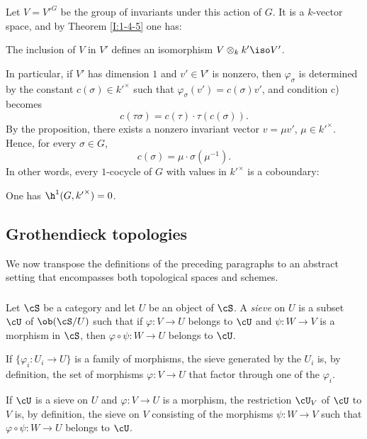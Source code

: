\documentclass[oneside]{book}
\begin{document}
Let $V={V'}^G$ be the group of invariants under this action of $G$. It
is a $k$-vector space, and by Theorem \ref{I:1-4-5} one has:

\begin{proposition}\label{I:1-5-2}
The inclusion of $V$ in $V'$ defines an isomorphism
$V\otimes_k k'\iso V'$.
\end{proposition}

In particular, if $V'$ has dimension $1$ and $v'\in V'$ is nonzero, then
$\varphi_\sigma$ is determined by the constant
$c(\sigma)\in {k'}^\times$ such that
$\varphi_\sigma(v')=c(\sigma)v'$, and condition c) becomes
\[
  c(\tau\sigma) = c(\tau)\cdot \tau(c(\sigma))\text{.}
\]
By the proposition, there exists a nonzero invariant vector
$v=\mu v'$, $\mu\in {k'}^\times$. Hence, for every $\sigma\in G$,
\[
  c(\sigma) = \mu\cdot \sigma(\mu^{-1})\text{.}
\]
In other words, every $1$-cocycle of $G$ with values in
${k'}^\times$ is a coboundary:

\begin{corollary}\label{I:1-5-3}
One has $\h^1(G,{k'}^\times)=0$.
\end{corollary}

\subsection{Grothendieck topologies}\label{I:1-6}

We now transpose the definitions of the preceding paragraphs to an
abstract setting that encompasses both topological spaces and schemes.

\subsubsection{}\label{I:1-6-1}

Let $\cS$ be a category and let $U$ be an object of $\cS$. A
\emph{sieve} on $U$ is a subset $\cU$ of $\ob(\cS/U)$ such that if
$\varphi:V\to U$ belongs to $\cU$ and $\psi:W\to V$ is a morphism in
$\cS$, then $\varphi\circ\psi:W\to U$ belongs to $\cU$.

If $\{\varphi_i:U_i\to U\}$ is a family of morphisms, the sieve generated
by the $U_i$ is, by definition, the set of morphisms $\varphi:V\to U$
that factor through one of the $\varphi_i$.

If $\cU$ is a sieve on $U$ and $\varphi:V\to U$ is a morphism, the
restriction $\cU_V$ of $\cU$ to $V$ is, by definition, the sieve on
$V$ consisting of the morphisms $\psi:W\to V$ such that
$\varphi\circ\psi:W\to U$ belongs to $\cU$.
\end{document}
